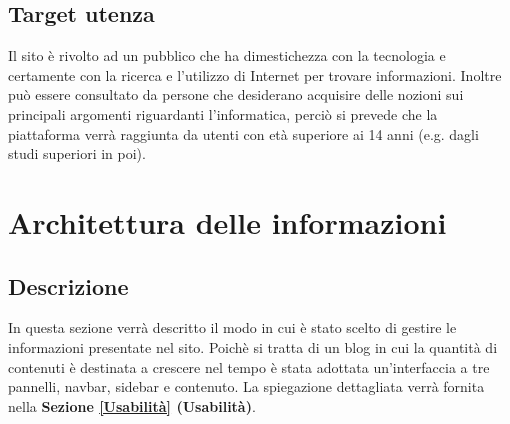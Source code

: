 \documentclass[12pt]{article}
\begin{document}
	\subsection{Target utenza}
		Il sito è rivolto ad un pubblico che ha dimestichezza con la tecnologia e certamente con la ricerca e l'utilizzo di Internet per trovare informazioni. Inoltre può essere consultato da persone che desiderano acquisire delle nozioni sui principali argomenti riguardanti l'informatica, perciò si prevede che la piattaforma verrà raggiunta da utenti con età superiore ai 14 anni (e.g. dagli studi superiori in poi).
		
	\section{Architettura delle informazioni}
	\subsection{Descrizione}
		In questa sezione verrà descritto il modo in cui è stato scelto di gestire le informazioni presentate nel sito. Poichè si tratta di un blog in cui la quantità di contenuti è destinata a crescere nel tempo è stata adottata un'interfaccia a tre pannelli, navbar, sidebar e contenuto. La spiegazione dettagliata verrà fornita nella \textbf{Sezione \ref{Usabilità} (Usabilità)}.
\end{document}
